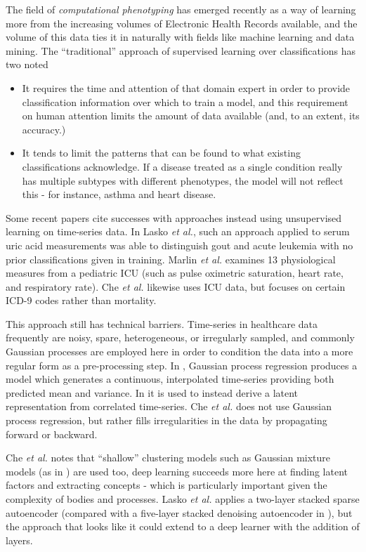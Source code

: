 \documentclass[journal]{IEEEtran}
\begin{document}
The field of \emph{computational phenotyping}\cite{Che2015} has
emerged recently as a way of learning more from the increasing volumes
of Electronic Health Records available, and the volume of this data
ties it in naturally with fields like machine learning and data
mining.  The ``traditional'' approach of supervised learning over
classifications has two noted 

\begin{itemize}
\item{It requires the time and attention of that domain expert in
  order to provide classification information over which to train a
  model, and this requirement on human attention limits the amount of
  data available (and, to an extent, its accuracy.)}
\item{It tends to limit the patterns that can be found to what
  existing classifications acknowledge.  If a disease treated as a
  single condition really has multiple subtypes with different
  phenotypes, the model will not reflect this - for instance, asthma
  and heart disease\cite{Lasko2013}.}
\end{itemize}

Some recent papers\cite{Marlin,Lasko2013,Johnson2016} cite
successes with approaches instead using unsupervised learning on
time-series data.  In Lasko \emph{et al.}\cite{Lasko2013}, such an
approach applied to serum uric acid measurements was able to
distinguish gout and acute leukemia with no prior classifications
given in training.  Marlin \emph{et al.}\cite{Marlin} examines 13
physiological measures from a pediatric ICU (such as pulse oximetric
saturation, heart rate, and respiratory rate). Che \emph{et
  al.}\cite{Che2015} likewise uses ICU data, but focuses on certain
ICD-9 codes rather than mortality.

This approach still has technical barriers.  Time-series in healthcare
data frequently are noisy, spare, heterogeneous, or irregularly
sampled, and commonly Gaussian processes are employed here in order to
condition the data into a more regular form as a pre-processing step.
In \cite{Lasko2013}, Gaussian process regression produces a model
which generates a continuous, interpolated time-series providing both
predicted mean and variance.  In \cite{Ghassemi2015} it is used to
instead derive a latent representation from correlated time-series.
Che \emph{et al.}\cite{Che2015} does not use Gaussian process
regression, but rather fills irregularities in the data by propagating
forward or backward.

Che \emph{et al.}\cite{Che2015} notes that ``shallow'' clustering
models such as Gaussian mixture models (as in \cite{Marlin}) are used
too, deep learning succeeds more here at finding latent factors and
extracting concepts - which is particularly important given the
complexity of bodies and processes.  Lasko \emph{et
  al.}\cite{Lasko2013} applies a two-layer stacked sparse autoencoder
(compared with a five-layer stacked denoising autoencoder in
\cite{Che2015}), but the approach that looks like it could extend to a
deep learner with the addition of layers.
\end{document}
